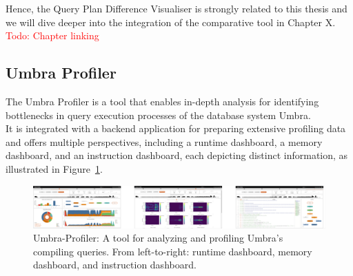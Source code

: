 Hence, the Query Plan Difference Visualiser is strongly related to this thesis and we will dive deeper into the integration of the comparative tool in Chapter X. \textcolor{red}{Todo: Chapter linking}



\subsection{Umbra Profiler}
The Umbra Profiler is a tool that enables in-depth analysis for identifying bottlenecks in query execution processes of the database system Umbra.
\\ It is integrated with a backend application for preparing extensive profiling data and offers multiple perspectives, including a runtime dashboard, a memory dashboard, and an instruction dashboard, each depicting distinct information, as illustrated in Figure~\ref{fig:umbra-profiler}.

\begin{figure}[h]
  \centering
  \includegraphics[width=1\linewidth]{figures/umbra-profiler.png}
  \caption{Umbra-Profiler: A tool for analyzing and profiling Umbra’s compiling queries. From left-to-right: runtime dashboard, memory dashboard, and instruction dashboard.}
  \label{fig:umbra-profiler}
\end{figure}

